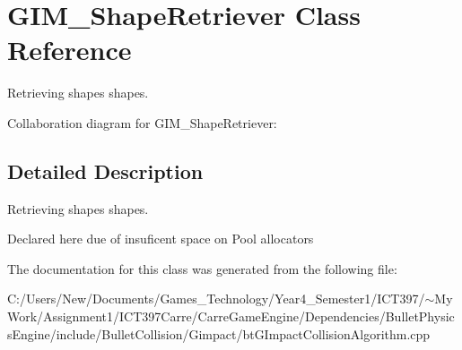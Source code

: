 \hypertarget{class_g_i_m___shape_retriever}{
\section{GIM\_\-ShapeRetriever Class Reference}
\label{class_g_i_m___shape_retriever}
}
Retrieving shapes shapes.  


Collaboration diagram for GIM\_\-ShapeRetriever:

\subsection{Detailed Description}
Retrieving shapes shapes. 

Declared here due of insuficent space on Pool allocators 

The documentation for this class was generated from the following file:\begin{CompactItemize}
\item 
C:/Users/New/Documents/Games\_\-Technology/Year4\_\-Semester1/ICT397/$\sim$My Work/Assignment1/ICT397Carre/CarreGameEngine/Dependencies/BulletPhysicsEngine/include/BulletCollision/Gimpact/btGImpactCollisionAlgorithm.cpp\end{CompactItemize}
